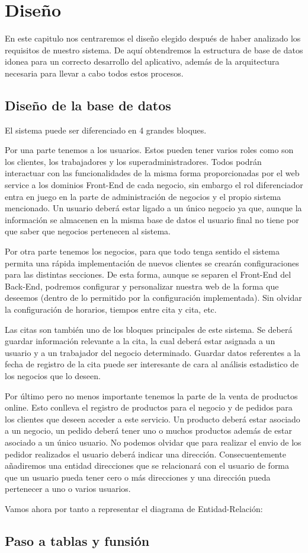 \chapter{Diseño}
 En este capitulo nos centraremos el diseño elegido después de haber analizado los requisitos de nuestro sistema. De aquí obtendremos la estructura de base de datos idonea para un correcto desarrollo del aplicativo, además de la arquitectura necesaria para llevar a cabo todos estos procesos.
 
\section{Diseño de la base de datos}

El sistema puede ser diferenciado en 4 grandes bloques.

Por una parte tenemos a los usuarios. Estos pueden tener varios roles como son los clientes, los trabajadores y los superadministradores. Todos podrán interactuar con las funcionalidades de la misma forma  proporcionadas por el web service a los dominios Front-End de cada negocio, sin embargo el rol diferenciador entra en juego en la parte de administración de negocios y el propio sistema mencionado. Un usuario deberá estar ligado a un único negocio ya que, aunque la información se almacenen en la misma base de datos el usuario final no tiene por que saber que negocios pertenecen al sistema.

Por otra parte tenemos los negocios, para que todo tenga sentido el sistema permita una rápida implementación de nuevos clientes se crearán configuraciones para las distintas secciones. De esta forma, aunque se separen el Front-End del Back-End, podremos configurar y personalizar nuestra web de la forma que deseemos (dentro de lo permitido por la configuración implementada). Sin olvidar la configuración de horarios, tiempos entre cita y cita, etc.

Las citas son también uno de los bloques principales de este sistema. Se deberá guardar información relevante a la cita, la cual deberá estar asignada a un usuario y a un trabajador del negocio determinado. Guardar datos referentes a la fecha de registro de la cita puede ser interesante de cara al análisis estadistico de los negocios que lo deseen.

Por último pero no menos importante tenemos la parte de la venta de productos online. Esto conlleva el registro de productos para el negocio y de pedidos para los clientes que deseen acceder a este servicio. Un producto deberá estar asociado a un negocio, un pedido deberá tener uno o muchos productos además de estar asociado a un único usuario. No podemos olvidar que para realizar el envio de los pedidor realizados el usuario deberá indicar una dirección. Consecuentemente añadiremos una entidad direcciones que se relacionará con el usuario de forma que un usuario pueda tener cero o más direcciones y una dirección pueda pertenecer a uno o varios usuarios.

Vamos ahora por tanto a representar el diagrama de Entidad-Relación: 

\section{Paso a tablas y funsión}
